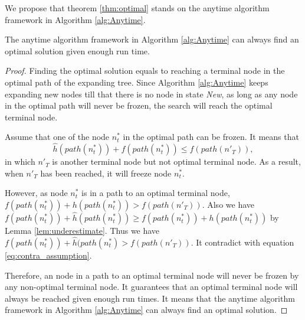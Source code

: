 We propose that theorem \ref{thm:optimal} stands on the anytime algorithm framework in Algorithm \ref{alg:Anytime}.

\begin{thm} 
\label{thm:optimal}
The anytime algorithm framework in Algorithm \ref{alg:Anytime} can always find an optimal solution given enough run time.
\begin{proof}

Finding the optimal solution equals to reaching a terminal node in the optimal path of the expanding tree.
Since Algorithm \ref{alg:Anytime} keeps expanding new nodes till that there is no node in state \emph{New}, as long as any node in the optimal path will never be frozen, the search will reach the optimal terminal node.

Assume that one of the node $ n^{*}_{t} $ in the optimal path can be frozen. It means that 
\begin{equation}
\label{eq:contra_assumption}
\hat{h}(path(n^{*}_{t})) + f(path(n^{*}_{t})) \leq f(path(n'_{T})),
\end{equation}
in which $ n'_{T} $ is another terminal node but not optimal terminal node.
As a result, when $ n'_{T} $ has been reached, it will freeze node $ n^{*}_{t} $. 

However, as node $ n^{*}_{t} $ is in a path to an optimal terminal node, $ f(path(n^{*}_{t})) + h(path(n^{*}_{t})) > f(path(n'_{T})) $.
Also we have $ f(path(n^{*}_{t})) + \hat{h}(path(n^{*}_{t})) \geq f(path(n^{*}_{t})) + h(path(n^{*}_{t})) $ by Lemma \ref{lem:underestimate}.
Thus we have $ f(path(n^{*}_{t})) + \hat{h}(path(n^{*}_{t}) > f(path(n'_{T})) $. It contradict with equation \eqref{eq:contra_assumption}.

Therefore, an node in a path to an optimal terminal node will never be frozen by any non-optimal terminal node.
It guarantees that an optimal terminal node will always be reached given enough run times.
It means that the anytime algorithm framework in Algorithm \ref{alg:Anytime} can always find an optimal solution.

\end{proof}
\end{thm}
